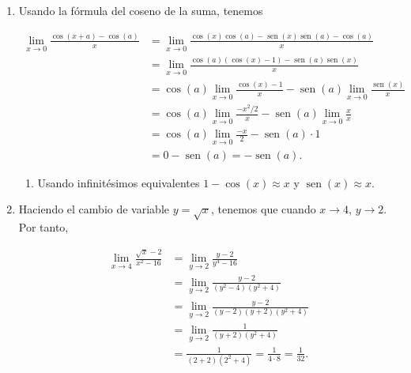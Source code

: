 \documentclass[
  spanish,
  a4paper,
]{scrreport}
\providecommand{\tightlist}{%
  \setlength{\itemsep}{0pt}\setlength{\parskip}{0pt}}
\theoremstyle{definition}
\theoremstyle{remark}
\begin{document}
\begin{tcolorbox}[enhanced jigsaw, arc=.35mm, bottomrule=.15mm, bottomtitle=1mm, breakable, colback=white, colbacktitle=quarto-callout-tip-color!10!white, colframe=quarto-callout-tip-color-frame, coltitle=black, left=2mm, leftrule=.75mm, opacityback=0, opacitybacktitle=0.6, rightrule=.15mm, title=\textcolor{quarto-callout-tip-color}{\faLightbulb}\hspace{0.5em}{Solución}, titlerule=0mm, toprule=.15mm, toptitle=1mm]

\begin{enumerate}
\def\labelenumi{\alph{enumi}.}
\item
  Usando la fórmula del coseno de la suma, tenemos

  \begin{align*}
  \lim_{x\to 0} \frac{\cos(x+a)-\cos(a)}{x} 
  &= \lim_{x\to 0} \frac{\cos(x)\cos(a) - \operatorname{sen}(x)\operatorname{sen}(a) - \cos(a)}{x} \\
  &= \lim_{x\to 0} \frac{\cos(a)(\cos(x) - 1) - \operatorname{sen}(a)\operatorname{sen}(x)}{x} \\
  &= \cos(a) \lim_{x\to 0} \frac{\cos(x) - 1}{x} - \operatorname{sen}(a) \lim_{x\to 0} \frac{\operatorname{sen}(x)}{x} \\
  &= \cos(a) \lim_{x\to 0} \frac{-x^2/2}{x} - \operatorname{sen}(a) \lim_{x\to 0} \frac{x}{x} \tag{1} \\
  &= \cos(a) \lim_{x\to 0} \frac{-x}{2} - \operatorname{sen}(a) \cdot 1 \\
  &= 0 - \operatorname{sen}(a) 
  = -\operatorname{sen}(a).
  \end{align*}

  \begin{enumerate}
  \def\labelenumii{(\arabic{enumii})}
  \tightlist
  \item
    Usando infinitésimos equivalentes \(1-\cos(x)\approx x\) y
    \(\operatorname{sen}(x)\approx x\).
  \end{enumerate}
\item
  Haciendo el cambio de variable \(y = \sqrt{x}\), tenemos que cuando
  \(x \to 4\), \(y \to 2\). Por tanto,

  \begin{align*}
  \lim_{x\to 4} \frac{\sqrt{x}-2}{x^2-16} 
  &= \lim_{y\to 2} \frac{y-2}{y^4 - 16} \\
  &= \lim_{y\to 2} \frac{y-2}{(y^2 - 4)(y^2 + 4)} \\
  &= \lim_{y\to 2} \frac{y-2}{(y-2)(y+2)(y^2 + 4)} \\
  &= \lim_{y\to 2} \frac{1}{(y+2)(y^2 + 4)} \\
  &= \frac{1}{(2+2)(2^2 + 4)} 
  = \frac{1}{4 \cdot 8} 
  = \frac{1}{32}.
  \end{align*}
\end{enumerate}

\end{tcolorbox}
\end{document}
